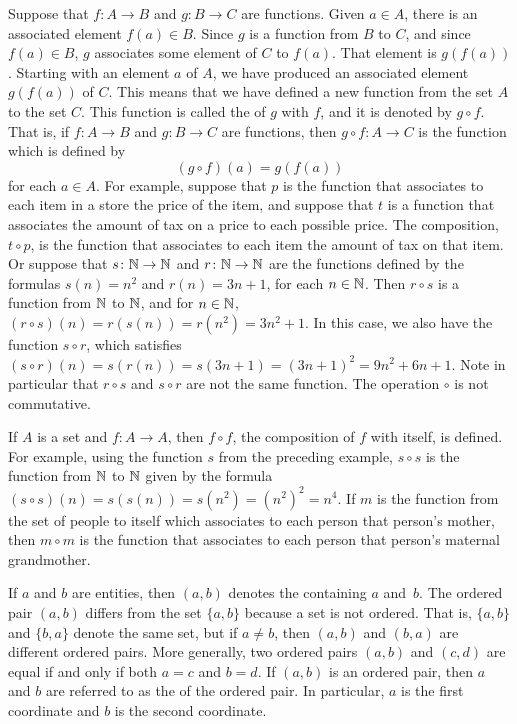 Suppose that $f\colon A\to B$ and $g\colon B\to C$ are functions.
Given $a\in A$, there is an associated element $f(a)\in B$.
Since $g$ is a function from $B$ to $C$, and since $f(a)\in B$,
$g$ associates some element of $C$ to $f(a)$.  That element
is $g(f(a))$.  Starting with an element $a$ of $A$, we have
produced an associated element $g(f(a))$ of $C$.  This means
that we have defined a new function from the set $A$ to
the set $C$.  This function is called the 
of $g$ with $f$, and it is denoted by $g\circ f$.  
That is, if $f\colon A\to B$ and $g\colon B\to C$ are functions,
then $g\circ f\colon A\to C$ is the function which is defined
by \[(g\circ f)(a) = g(f(a))\]
for each $a\in A$.  For example, suppose that $p$ is the function
that associates to each item in a store the price of the item,
and suppose that $t$ is a function that associates the amount of
tax on a price to each possible price.  The composition,
$t\circ p$, is the function that associates to each item the
amount of tax on that item.  Or suppose that 
$s\colon{\mathbb N}\to{\mathbb N}$ and $r\colon{\mathbb N}\to{\mathbb N}$ are the functions
defined by the formulas $s(n)=n^2$ and $r(n)=3n+1$, for each
$n\in{\mathbb N}$.  Then $r\circ s$ is a function from ${\mathbb N}$ to ${\mathbb N}$,
and for $n\in{\mathbb N}$, $(r\circ s)(n) = r(s(n)) = r(n^2) = 3n^2+1$.
In this case, we also have the function $s\circ r$, which 
satisfies $(s\circ r)(n) = s(r(n)) = s(3n+1) = (3n+1)^2 = 9n^2+6n+1$.
Note in particular that $r\circ s$ and $s\circ r$ are not
the same function.  The operation $\circ$ is not commutative.

If $A$ is a set and $f\colon A\to A$, then $f\circ f$,
the composition of $f$ with itself, is defined.  For example,
using the function $s$ from the preceding example,
$s\circ s$ is the function from ${\mathbb N}$ to ${\mathbb N}$ given by
the formula $(s\circ s)(n) = s(s(n))= s(n^2) = (n^2)^2 = n^4$.
If $m$ is the function from the set of people to itself which
associates to each person that person's mother, then
$m\circ m$ is the function that associates to each person
that person's maternal grandmother.


\medbreak

If $a$ and $b$ are entities, then $(a,b)$ denotes the
 containing $a$ and~$b$.  The ordered pair
$(a,b)$ differs from the set $\{a,b\}$ because a set is
not ordered.  That is, $\{a,b\}$ and $\{b,a\}$ denote the
same set, but if $a\not=b$, then $(a,b)$ and $(b,a)$ are
different ordered pairs.  More generally, two
ordered pairs $(a,b)$ and $(c,d)$ are equal if and only if
both $a=c$ and $b=d$.  If $(a,b)$ is an ordered pair,
then $a$ and $b$ are referred to as the  of the
ordered pair.  In particular, $a$ is the first coordinate and
$b$ is the second coordinate.

